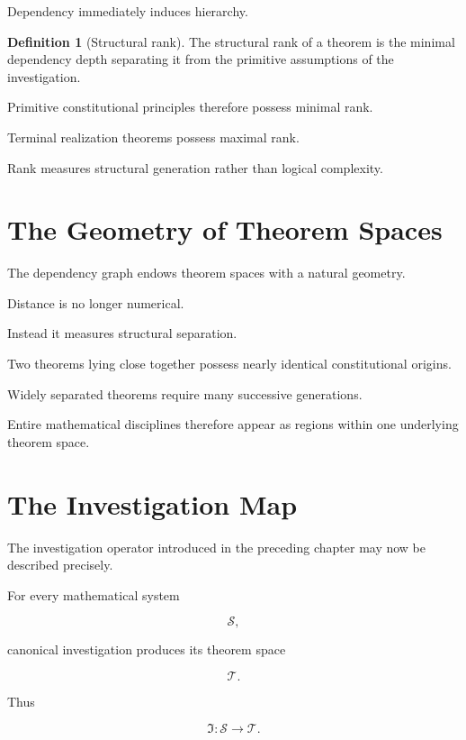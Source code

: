 \documentclass[13pt,openany]{book}
\theoremstyle{plain}
\theoremstyle{definition}
\newtheorem{definition}{Definition}[chapter]
\begin{document}
Dependency immediately induces hierarchy.

\begin{definition}[Structural rank]
The structural rank of a theorem is the minimal dependency depth separating it
from the primitive assumptions of the investigation.
\end{definition}

Primitive constitutional principles therefore possess minimal rank.

Terminal realization theorems possess maximal rank.

Rank measures structural generation rather than logical complexity.

\section{The Geometry of Theorem Spaces}

The dependency graph endows theorem spaces with a natural geometry.

Distance is no longer numerical.

Instead it measures structural separation.

Two theorems lying close together possess nearly identical constitutional
origins.

Widely separated theorems require many successive generations.

Entire mathematical disciplines therefore appear as regions within one
underlying theorem space.

\section{The Investigation Map}

The investigation operator introduced in the preceding chapter may now be
described precisely.

For every mathematical system

\[
\mathcal S,
\]

canonical investigation produces its theorem space

\[
\mathcal T.
\]

Thus

\[
\boxed{
\mathfrak I:
\mathcal S
\longrightarrow
\mathcal T.
}
\]
\end{document}
